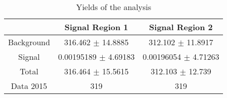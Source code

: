 \documentclass[10pt]{article}
\begin{document}
\begin{table}[htbp]
\begin{center}
\begin{tabular}{|c|c|c|}
\hline 
 & Signal Region 1 & Signal Region 2\\
\hline 
  Background   & \num[round-mode=figures,round-precision=3]{316.462} $\pm$ \num[round-mode=figures,round-precision=3]{14.8885} & \num[round-mode=figures,round-precision=3]{312.102} $\pm$ \num[round-mode=figures,round-precision=3]{11.8917} \\ 
  Signal   & \num[round-mode=figures,round-precision=3]{0.00195189} $\pm$ \num[round-mode=figures,round-precision=3]{4.69183} & \num[round-mode=figures,round-precision=3]{0.00196054} $\pm$ \num[round-mode=figures,round-precision=3]{4.71263} \\ 
\hline 
  Total  & \num[round-mode=figures,round-precision=3]{316.464} $\pm$ \num[round-mode=figures,round-precision=3]{15.5615} & \num[round-mode=figures,round-precision=3]{312.103} $\pm$ \num[round-mode=figures,round-precision=3]{12.739} \\ 
\hline 
  Data 2015   & 319 & 319 \\ 
\hline 
\end{tabular} 
\caption{Yields of the analysis} 
\end{center} 
\end{table} 
\end{document}
